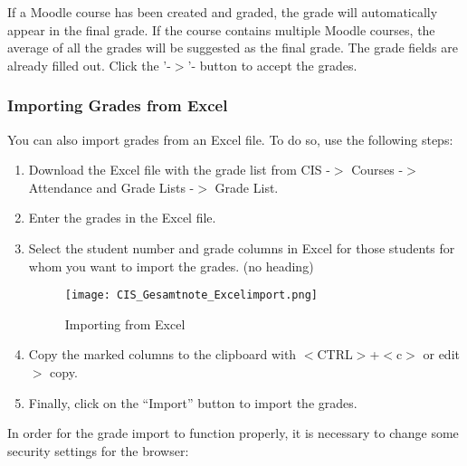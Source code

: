 If a Moodle course has been created and graded, the grade will automatically appear in the final grade.
If the course contains multiple Moodle courses, the average of all the grades will be suggested as the final grade.
The grade fields are already filled out. Click the '-$>$'- button to accept the grades.

\subsubsection{Importing Grades from Excel}
\label{ben}

You can also import grades from an Excel file. To do so, use the following steps:

\begin{enumerate}
\item Download the Excel file with the grade list from CIS -$>$ Courses -$>$ Attendance and Grade Lists -$>$ Grade List.
\item Enter the grades in the Excel file.
\item Select the student number and grade columns in Excel for those students for whom you want to import the grades. (no heading)
\begin{figure}[ht]
\begin{center}
\texttt{[image: CIS\_Gesamtnote\_Excelimport.png]}
\end{center}
\caption{Importing from Excel}\label{excelimport}
\end{figure}
\item Copy the marked columns to the clipboard with $<$CTRL$>$+$ <$c$>$ or edit$ >$ copy.
\item Finally, click on the "`Import"' button to import the grades.
\end{enumerate}
In order for the grade import to function properly, it is necessary to change some security settings for the browser:

